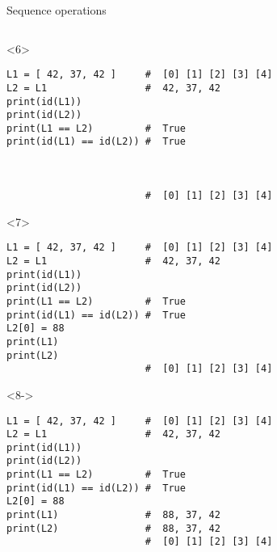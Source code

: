 \begin{frame}[fragile]{Sequence operations}
\begin{center}
\begin{columns}[onlytextwidth]
\begin{column}{\textwidth}
      \begin{onlyenv}<6>
        \begin{lstlisting}[style=python,morekeywords={for, in, range, list}]
L1 = [ 42, 37, 42 ]     #  [0] [1] [2] [3] [4]
L2 = L1                 #  42, 37, 42
print(id(L1))
print(id(L2))
print(L1 == L2)         #  True
print(id(L1) == id(L2)) #  True



                        #  [0] [1] [2] [3] [4] \end{lstlisting}
      \end{onlyenv}

      \begin{onlyenv}<7>
        \begin{lstlisting}[style=python,morekeywords={for, in, range, list}]
L1 = [ 42, 37, 42 ]     #  [0] [1] [2] [3] [4]
L2 = L1                 #  42, 37, 42
print(id(L1))
print(id(L2))
print(L1 == L2)         #  True
print(id(L1) == id(L2)) #  True
L2[0] = 88
print(L1)
print(L2)
                        #  [0] [1] [2] [3] [4] \end{lstlisting}
      \end{onlyenv}

      \begin{onlyenv}<8->
        \begin{lstlisting}[style=python,morekeywords={for, in, range, list}]
L1 = [ 42, 37, 42 ]     #  [0] [1] [2] [3] [4]
L2 = L1                 #  42, 37, 42
print(id(L1))
print(id(L2))
print(L1 == L2)         #  True
print(id(L1) == id(L2)) #  True
L2[0] = 88
print(L1)               #  88, 37, 42
print(L2)               #  88, 37, 42
                        #  [0] [1] [2] [3] [4] \end{lstlisting}
      \end{onlyenv}

    \end{column}
  \end{columns}

  \end{center}

\end{frame}


